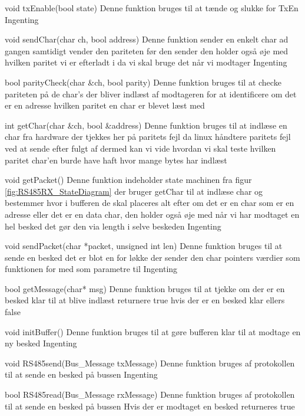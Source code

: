 \funk
{void txEnable(bool state)}
{Denne funktion bruges til at tænde og slukke for TxEn}
{Ingenting}
{
}

\funk
{void sendChar(char ch, bool address)}
{Denne funktion sender en enkelt char ad gangen samtidigt vender den pariteten før den sender den holder også øje med hvilken paritet vi er efterladt i da vi skal bruge det når vi modtager}
{Ingenting}
{
}

\funk
{bool parityCheck(char \&ch, bool parity) }
{Denne funktion bruges til at checke pariteten på de char's der bliver indlæst af modtageren for at identificere om det er en adresse}
{hvilken paritet en char er blevet læst med}
{
}

\funk
{int getChar(char \&ch, bool \&address) }
{Denne funktion bruges til at indlæse en char fra hardware der tjekkes her på paritets fejl da linux håndtere paritets fejl ved at sende  efter fulgt af  dermed kan vi vide hvordan vi skal teste hvilken paritet char'en burde have haft}
{hvor mange bytes  har indlæst}
{
}

\funk
{void getPacket()}
{Denne funktion indeholder state machinen fra figur \ref{fig:RS485RX_StateDiagram} der bruger getChar til at indlæse char og bestemmer hvor i bufferen de skal placeres alt efter om det er en char som er en adresse eller det er en data char, den holder også øje med når vi har modtaget en hel besked det gør den via length i selve beskeden}
{Ingenting}
{
}

\funk
{void sendPacket(char *packet, unsigned int len)}
{Denne funktion bruges til at sende en besked det er blot en for løkke der sender den char pointers værdier som funktionen for med som parametre til }
{Ingenting}
{
}

\funk
{bool getMessage(char* msg)}
{Denne funktion bruges til at tjekke om der er en besked klar til at blive indlæst}
{returnere true hvis der er en besked klar ellers false}
{
}

\funk
{void initBuffer()}
{Denne funktion bruges til at gøre bufferen klar til at modtage en ny besked}
{Ingenting}
{
}

\funk
{void RS485send(Bus\_Message\* txMessage)}
{Denne funktion bruges af protokollen til at sende en besked på bussen}
{Ingenting}
{
}

\funk
{bool RS485read(Bus\_Message\* rxMessage)}
{Denne funktion bruges af protokollen til at sende en besked på bussen}
{Hvis der er modtaget en besked returneres true}
{
}



